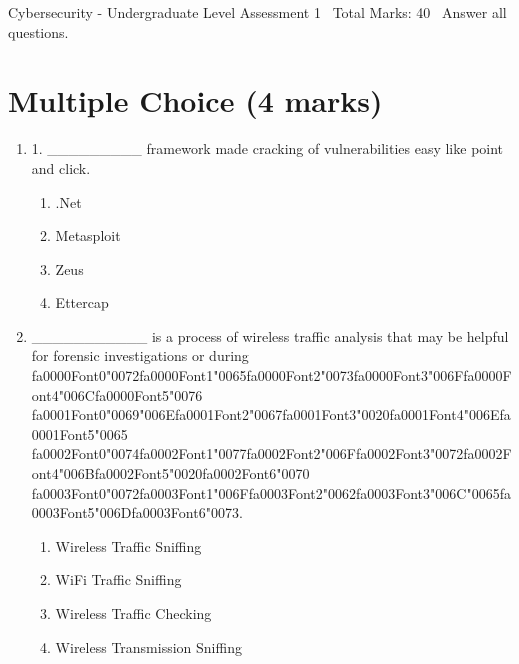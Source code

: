 \documentclass[12pt]{article}
\begin{document}
\begin{center}
Cybersecurity - Undergraduate Level Assessment 1 \
Total Marks: 40 \
Answer all questions.
\end{center}

\section*{Multiple Choice (4 marks)}
\begin{enumerate}[label=\arabic*.]
\item 1. \_\_\_\_\_\_\_\_\_ framework made cracking of vulnerabilities easy like point and click.
\begin{enumerate}[label=(\alph*)]
    \item .Net
    \item Metasploit
    \item Zeus
    \item Ettercap
\end{enumerate}
\item \_\_\_\_\_\_\_\_\_\_\_ is a process of wireless traffic analysis that may be helpful for forensic investigations or during {\csname fa0000Font0\endcsname\char"0072}{\csname fa0000Font1\endcsname\char"0065}{\csname fa0000Font2\endcsname\char"0073}{\csname fa0000Font3\endcsname\char"006F}{\csname fa0000Font4\endcsname\char"006C}{\csname fa0000Font5\endcsname\char"0076} {\csname fa0001Font0\endcsname\char"0069}{\char"006E}{\csname fa0001Font2\endcsname\char"0067}{\csname fa0001Font3\endcsname\char"0020}{\csname fa0001Font4\endcsname\char"006E}{\csname fa0001Font5\endcsname\char"0065} {\csname fa0002Font0\endcsname\char"0074}{\csname fa0002Font1\endcsname\char"0077}{\csname fa0002Font2\endcsname\char"006F}{\csname fa0002Font3\endcsname\char"0072}{\csname fa0002Font4\endcsname\char"006B}{\csname fa0002Font5\endcsname\char"0020}{\csname fa0002Font6\endcsname\char"0070} {\csname fa0003Font0\endcsname\char"0072}{\csname fa0003Font1\endcsname\char"006F}{\csname fa0003Font2\endcsname\char"0062}{\csname fa0003Font3\endcsname\char"006C}{\char"0065}{\csname fa0003Font5\endcsname\char"006D}{\csname fa0003Font6\endcsname\char"0073}.
\begin{enumerate}[label=(\alph*)]
    \item Wireless Traffic Sniffing
    \item WiFi Traffic Sniffing
    \item Wireless Traffic Checking
    \item Wireless Transmission Sniffing
\end{enumerate}
\end{enumerate}
\end{document}
